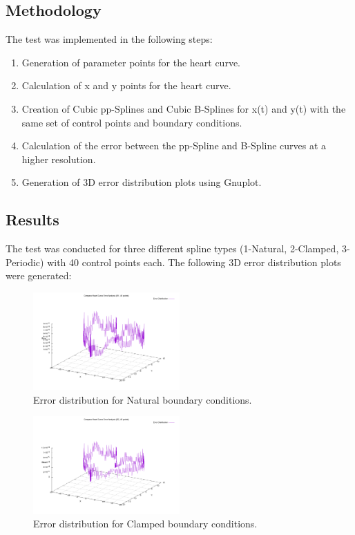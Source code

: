 \documentclass{article}
\begin{document}
\subsection{Methodology}
The test was implemented in the following steps:
\begin{enumerate}
    \item Generation of parameter points for the heart curve.
    \item Calculation of x and y points for the heart curve.
    \item Creation of Cubic pp-Splines and Cubic B-Splines for x(t) and y(t) with the same set of control points and boundary conditions.
    \item Calculation of the error between the pp-Spline and B-Spline curves at a higher resolution.
    \item Generation of 3D error distribution plots using Gnuplot.
\end{enumerate}

\subsection{Results}
The test was conducted for three different spline types (1-Natural, 2-Clamped, 3- Periodic) with 40 control points each. The following 3D error distribution plots were generated:

\begin{figure}[H]
    \centering
    \includegraphics[width=0.5\textwidth]{../figure/compare_1heartspline_error3d_40.png}
    \caption{Error distribution for Natural boundary conditions.}
    \label{fig:b1_error}
\end{figure}

\begin{figure}[H]
    \centering
    \includegraphics[width=0.5\textwidth]{../figure/compare_2heartspline_error3d_40.png}
    \caption{Error distribution for Clamped boundary conditions.}
    \label{fig:b2_error}
\end{figure}
\end{document}
